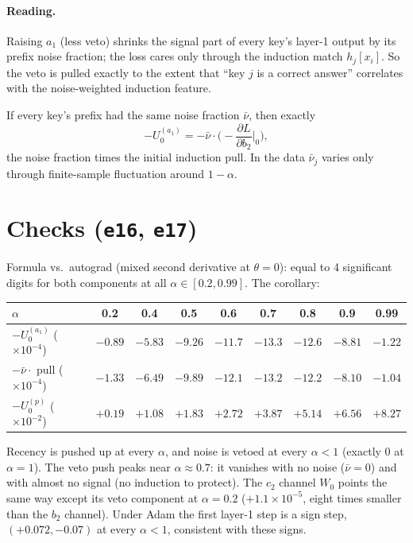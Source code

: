 \documentclass[11pt]{article}
\theoremstyle{remark}\newtheorem{remark}{Remark}
\newcommand{\1}{\mathbf{1}}
\begin{document}
\paragraph{Reading.} Raising $a_1$ (less veto) shrinks the signal part of every key's layer-1
output by its prefix noise fraction; the loss cares only through the induction match
$h_j[x_i]$. So the veto is pulled exactly to the extent that ``key $j$ is a correct answer''
correlates with the noise-weighted induction feature.

\begin{corollary}
If every key's prefix had the same noise fraction $\bar\nu$, then exactly
\[
-U_0^{(a_1)}=-\bar\nu\cdot\Big(-\frac{\partial L}{\partial b_2}\Big|_0\Big),
\]
the noise fraction times the initial induction pull. In the data $\bar\nu_j$ varies only through
finite-sample fluctuation around $1-\alpha$.
\end{corollary}

\section{Checks (\texttt{e16}, \texttt{e17})}
Formula vs.\ autograd (mixed second derivative at $\theta=0$): equal to 4 significant digits for both
components at all $\alpha\in[0.2,0.99]$. The corollary:
\begin{center}\begin{tabular}{lcccccccc}\toprule
$\alpha$ & 0.2 & 0.4 & 0.5 & 0.6 & 0.7 & 0.8 & 0.9 & 0.99\\\midrule
$-U_0^{(a_1)}$ ($\times10^{-4}$) & $-0.89$ & $-5.83$ & $-9.26$ & $-11.7$ & $-13.3$ & $-12.6$ & $-8.81$ & $-1.22$\\
$-\bar\nu\cdot$ pull ($\times10^{-4}$) & $-1.33$ & $-6.49$ & $-9.89$ & $-12.1$ & $-13.2$ & $-12.2$ & $-8.10$ & $-1.04$\\
$-U_0^{(p)}$ ($\times10^{-2}$) & $+0.19$ & $+1.08$ & $+1.83$ & $+2.72$ & $+3.87$ & $+5.14$ & $+6.56$ & $+8.27$\\\bottomrule
\end{tabular}\end{center}
Recency is pushed up at every $\alpha$, and noise is vetoed at every $\alpha<1$ (exactly $0$ at
$\alpha=1$). The veto push peaks near $\alpha\approx0.7$: it vanishes with no noise ($\bar\nu=0$) and
with almost no signal (no induction to protect). The $c_2$ channel $W_0$ points the same way except
its veto component at $\alpha=0.2$ ($+1.1\times10^{-5}$, eight times smaller than the $b_2$ channel).
Under Adam the first layer-1 step is a sign step, $(+0.072,-0.07)$ at every $\alpha<1$, consistent
with these signs.
\end{document}
